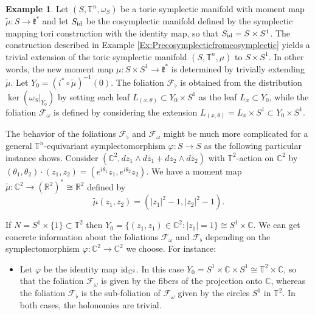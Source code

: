 \documentclass[
  a4paper, 
  reqno, 
  oneside, 
  12pt
]{amsart}
\theoremstyle{definition}
\newtheorem{example}[theorem]{Example}
\theoremstyle{remark}
\begin{document}
\begin{example}
	\label{Ex:CosymplecticTrivialProduct}
	Let $(S,\mathbb{T}^n,\omega_S)$ be a toric symplectic manifold with moment map $\tilde \mu:S\to \mathfrak{k}^\ast$ and let $S_{\textnormal{id}}$ be the cosymplectic manifold defined by the symplectic mapping tori construction with the identity map, so that $S_{\textnormal{id}}=S\times S^1$. The construction described in Example \ref{Ex:Precosymplecticfromcosymplectic} yields a trivial extension of the toric symplectic manifold $(S,\mathbb{T}^n,\mu)$ to $S\times S^1$. In other words, the new moment map $\mu:S\times S^1\to \mathfrak{k}^\ast$ is determined by trivially extending $\tilde{\mu}$. Let $Y_0=(i^*\circ \tilde \mu)^{-1}(0)$. The foliation $\mathcal{F}_\flat$ is obtained from the distribution $\ker(\omega_S|_{Y_0})$ by setting each leaf $L_{(x,\theta)}\subset Y_0\times S^1$ as the leaf $L_x\subset Y_0$, while the foliation $\mathcal{F}_\omega$ is defined by considering the extension $L_{(x,\theta)}=L_x\times S^1\subset Y_0\times S^1$. 
	
	The behavior of the foliations $\mathcal{F}_\flat$ and  $\mathcal{F}_\omega$ might be much more complicated for a general $\mathbb{T}^n$-equivariant symplectomorphism $\varphi: S\to S$ as the following particular instance shows. Consider  $(\mathbb{C}^2, dz_1\wedge d\bar z_1+dz_2\wedge d\bar z_2)$ with $\mathbb{T}^2$-action  on $\mathbb{C}^2$ by $(\theta_1,\theta_2)\cdot(z_1,z_2)=(e^{i\theta_1}z_1,e^{i\theta_2}z_2)$. We have a moment map $\tilde\mu:\mathbb{C}^2\to (\mathbb{R}^2)^\ast\cong\mathbb{R}^2 $ defined by
	$$\tilde\mu(z_1,z_2)=(|z_1|^2-1,|z_2|^2-1).$$ 
	
	
	
	
	If $N=S^1\times \{1\}\subset \mathbb{T}^2$ then $Y_0=\{(z_1,z_1)\in \mathbb{C}^2: |z_1|=1\}\cong S^1\times \mathbb{C}$. We can get concrete information about the foliations $\mathcal{F}_\omega$ and $\mathcal{F}_\flat$ depending on the symplectomorphism $\varphi:\mathbb{C}^2\to \mathbb{C}^2$ we choose. For instance:
	\begin{itemize}
		\item Let $\varphi$ be the identity map $\textnormal{id}_{\mathbb{C}^2}$. In this case $Y_0=S^1\times \mathbb{C}\times S^1\cong \mathbb{T}^2\times \mathbb{C}$, so that the foliation $\mathcal{F}_\omega$ is given by the fibers of the projection onto $\mathbb{C}$, whereas the foliation $\mathcal{F}_\flat$ is the sub-foliation of $\mathcal{F}_\omega$ given by the circles $S^1$ in $\mathbb{T}^2$. In both cases, the holonomies are trivial.
		

\end{itemize}
\end{example}
\end{document}
